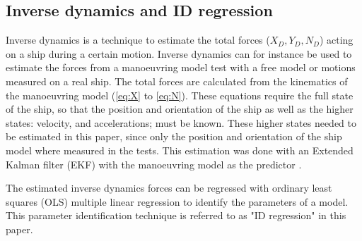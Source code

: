 \subsection{Inverse dynamics and ID regression}
\label{sec:inverse_dynamics}
Inverse dynamics is a technique to estimate the total forces ($X_D,Y_D,N_D$) acting on a ship during a certain motion. Inverse dynamics can for instance be used to estimate the forces from a manoeuvring model test with a free model or motions measured on a real ship. The total forces are calculated from the kinematics of the manoeuvring model (\autoref{eq:X} to \autoref{eq:N}). These equations require the full state of the ship, so that the position and orientation of the ship as well as the higher states: velocity, and accelerations; must be known. 
These higher states needed to be estimated in this paper, since only the position and orientation of the ship model where measured in the tests. This estimation was done with an Extended Kalman filter (EKF) with the manoeuvring model as the predictor .

The estimated inverse dynamics forces can be regressed with ordinary least squares (OLS) multiple
linear regression to identify the parameters of a model. This parameter identification technique is referred to as "ID regression" in this paper.